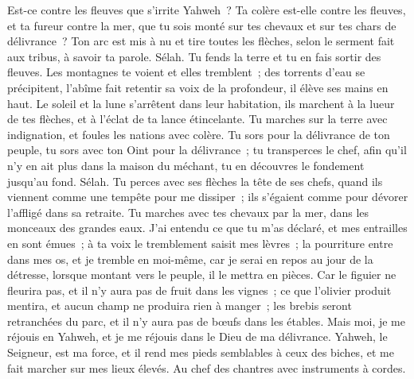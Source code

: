 \begin{multicols}{2}
Est-ce contre les fleuves que s'irrite Yahweh~? Ta colère est-elle contre les fleuves, et ta fureur contre la mer, que tu sois monté sur tes chevaux et sur tes chars de délivrance~?
Ton arc est mis à nu et tire toutes les flèches, selon le serment fait aux tribus, à savoir ta parole. Sélah. Tu fends la terre et tu en fais sortir des fleuves.
Les montagnes te voient et elles tremblent~; des torrents d'eau se précipitent, l'abîme fait retentir sa voix de la profondeur, il élève ses mains en haut.
Le soleil et la lune s'arrêtent dans leur habitation, ils marchent à la lueur de tes flèches, et à l'éclat de ta lance étincelante.
Tu marches sur la terre avec indignation, et foules les nations avec colère.
Tu sors pour la délivrance de ton peuple, tu sors avec ton Oint pour la délivrance~; tu transperces le chef, afin qu'il n'y en ait plus dans la maison du méchant, tu en découvres le fondement jusqu'au fond. Sélah.
Tu perces avec ses flèches la tête de ses chefs, quand ils viennent comme une tempête pour me dissiper~; ils s'égaient comme pour dévorer l'affligé dans sa retraite.
Tu marches avec tes chevaux par la mer, dans les monceaux des grandes eaux.
J'ai entendu ce que tu m'as déclaré, et mes entrailles en sont émues~; à ta voix le tremblement saisit mes lèvres~; la pourriture entre dans mes os, et je tremble en moi-même, car je serai en repos au jour de la détresse, lorsque montant vers le peuple, il le mettra en pièces.
Car le figuier ne fleurira pas, et il n'y aura pas de fruit dans les vignes~; ce que l'olivier produit mentira, et aucun champ ne produira rien à manger~; les brebis seront retranchées du parc, et il n'y aura pas de bœufs dans les étables.
Mais moi, je me réjouis en Yahweh, et je me réjouis dans le Dieu de ma délivrance.
Yahweh, le Seigneur, est ma force, et il rend mes pieds semblables à ceux des biches, et me fait marcher sur mes lieux élevés. Au chef des chantres avec instruments à cordes.
\PPE{}
\end{multicols}
